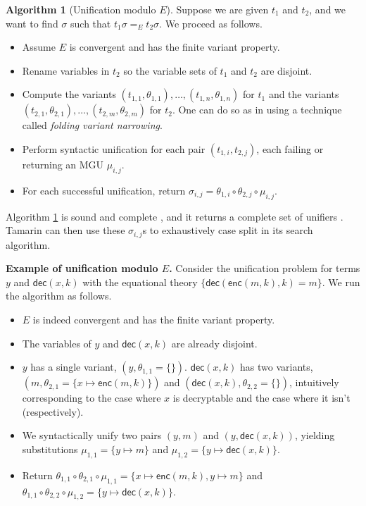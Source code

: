 \documentclass{article}
\theoremstyle{definition}
\newtheorem{algorithm}{Algorithm}
\begin{document}
\begin{algorithm}[Unification modulo $E$] \label{alg:unification-mod-e}
Suppose we are given $t_1$ and $t_2$, and we want to find $\sigma$ such that $t_1 \sigma =_E t_2 \sigma$.
We proceed as follows.
\begin{itemize}
  \item[] Assume $E$ is convergent and has the finite variant property.
  \item[(1)] Rename variables in $t_2$ so the variable sets of $t_1$ and $t_2$ are disjoint.
  \item[(2)] Compute the variants $(t_{1,1}, \theta_{1,1}), \dots, (t_{1,n}, \theta_{1,n})$
            for $t_1$ and the variants $(t_{2,1}, \theta_{2,1}), \dots, (t_{2,m}, \theta_{2,m})$
            for $t_2$. One can do so as in \cite{folding_variant_narrowing} 
            using a technique called \emph{folding variant narrowing}.
  \item[(3)] Perform syntactic unification for each pair $(t_{1,i}, t_{2,j})$, each failing or
            returning an MGU $\mu_{i,j}$.
  \item[(4)] For each successful unification, return 
            $\sigma_{i,j} = \theta_{1,i} \circ \theta_{2, j} \circ \mu_{i,j}$.
\end{itemize}
\end{algorithm}
Algorithm \ref{alg:unification-mod-e} is sound and complete \cite{fvp_unification}, and
it returns a complete set of unifiers \cite{fvp_unification}.
Tamarin can then use these $\sigma_{i,j}$s to exhaustively 
case split in its search algorithm.

\textbf{Example of unification modulo $E$.}
Consider the unification problem for terms $y$ and  $\textsf{dec}(x,k)$
with the equational theory $\{ \textsf{dec}(\textsf{enc}(m, k), k) = m \}$.
We run the algorithm as follows. 
\begin{itemize}
    \item[] $E$ is indeed convergent and has the finite variant property.
    \item[(1)] The variables of $y$ and $\textsf{dec}(x,k)$ are already disjoint.
    \item[(2)] $y$ has a single variant, $(y, \theta_{1,1} = \{\})$. $\textsf{dec}(x,k)$ has two variants, $(m, \theta_{2,1} = \{x \mapsto \textsf{enc}(m, k)\})$ and $(\textsf{dec}(x, k), \theta_{2,2} = \{\})$, intuitively corresponding to the case where $x$ is decryptable and the case where it isn't (respectively).
    \item[(3)] We syntactically unify two pairs $(y, m)$ and $(y, \textsf{dec}(x, k))$, yielding substitutions $\mu_{1,1} = \{ y \mapsto m \}$ and $\mu_{1, 2} =\{ y \mapsto \textsf{dec}(x, k)\}$.
    \item[(4)] Return $\theta_{1,1} \circ \theta_{2,1} \circ \mu_{1,1} = \{ x \mapsto \textsf{enc}(m, k), y \mapsto m \}$ and $\theta_{1,1} \circ \theta_{2,2} \circ \mu_{1,2} = \{ y \mapsto \textsf{dec}(x,k) \}$.
\end{itemize}
\end{document}
